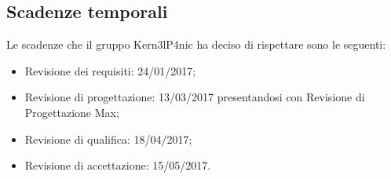 \documentclass[../PianoDiQualifica.tex]{subfiles}
\begin{document}
	\subsection{Scadenze temporali}
	Le scadenze che il gruppo Kern3lP4nic ha deciso di rispettare sono le seguenti:
	\begin{itemize}
		\item Revisione dei requisiti: 24/01/2017;
		\item Revisione di progettazione: 13/03/2017 presentandosi con Revisione di Progettazione Max;
		\item Revisione di qualifica: 18/04/2017;
		\item Revisione di accettazione: 15/05/2017.
	\end{itemize}
\end{document}

